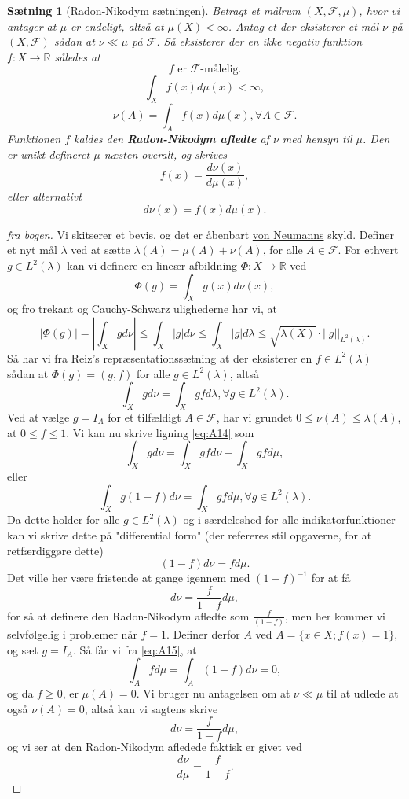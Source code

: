 \documentclass[12pt]{report}
\newtheorem{theorem}[lemma]{Sætning}
\theoremstyle{break}
\newtheorem*{proof}{Bevis}
\theoremstyle{break}
\newcommand{\RR}{\mathbb{R}}
\newcommand{\FI}{\mathcal{F}}
\newcommand{\1}{\mathds{1}}
\begin{document}
\begin{theorem}[Radon-Nikodym sætningen]
	 Betragt et målrum $(X,\FI,\mu)$, hvor vi antager at $\mu$ er endeligt, altså at  $\mu(X)<\infty$. Antag et der eksisterer et mål $\nu$ på $(X,\FI)$ sådan at $\nu \ll \mu$ på $\FI$. Så eksisterer der en ikke negativ funktion $f\colon X\to \RR$ således at
	 \[ f \text{ er }\FI\text{-målelig.} \]
	 \[ \int_X f(x)d\mu(x)<\infty, \]
	 \[ \nu(A)=\int_A f(x)d\mu(x), \forall A\in \FI .\]
	 Funktionen $f$ kaldes den {\bf Radon-Nikodym afledte} af $\nu$ med hensyn til $\mu$. Den er unikt defineret $\mu$ næsten overalt, og skrives
	 \[ f(x)=\frac{d\nu(x)}{d\mu(x)}, \]
	 eller alternativt
	 \[ d\nu(x)=f(x)d\mu(x). \]
\end{theorem}
\begin{proof}[fra bogen]
	Vi skitserer et bevis, og det er åbenbart \href{https://en.wikipedia.org/wiki/John_von_Neumann}{von Neumanns} skyld. Definer et nyt mål $\lambda$ ved at sætte $\lambda(A) = \mu(A)+\nu(A)$, for alle $A\in \FI$. For ethvert $g\in L^2(\lambda)$ kan vi definere en lineær afbildning $\Phi \colon X \to \RR$ ved
	\[ \Phi(g)=\int_Xg(x)d\nu(x), \]
	og fro trekant og Cauchy-Schwarz ulighederne har vi, at
	\[ |\Phi(g)|=\left\vert \int_X gd\nu\right\vert \leq \int_X |g|d\nu \leq \int_X |g|d\lambda \leq \sqrt{\lambda(X)}\cdot ||g||_{L^2(\lambda)}. \] 
	Så har vi fra Reiz's repræsentationssætning at der eksisterer en $f\in L^2(\lambda)$ sådan at $\Phi(g)=(g,f)$ for alle $g\in L^2(\lambda)$, altså
	\begin{equation}
		\int_X gd\nu=\int_X gfd\lambda, \forall g\in L^2(\lambda).\label{eq:A14}
	\end{equation}
	Ved at vælge $g=I_A$ for et tilfældigt $A\in \FI$, har vi grundet $0\leq \nu(A)\leq\lambda(A)$, at $0\leq f \leq 1$. Vi kan nu skrive ligning \ref{eq:A14} som
	\[ \int_Xgd\nu=\int_X gfd\nu+\int_X gfd\mu, \]
	eller
	\begin{equation}
		\int_X g(1-f)d\nu=\int_X gfd\mu, \forall g\in L^2(\lambda). \label{eq:A15}
	\end{equation}
	Da dette holder for alle $g\in L^2(\lambda)$ og i særdeleshed for alle indikatorfunktioner kan vi skrive dette på "differential form" (der refereres stil opgaverne, for at retfærdiggøre dette)
	\[ (1-f)d\nu=fd\mu. \]
	Det ville her være fristende at gange igennem med $(1-f)^{-1}$ for at få
	\[ d\nu=\frac{f}{1-f}d\mu, \]
	for så at definere den Radon-Nikodym afledte som $\frac{f}{(1-f)}$, men her kommer vi selvfølgelig i problemer når $f=1$. Definer derfor $A$ ved $A=\{ x\in X;f(x)=1 \}$, og sæt $g=I_A$. Så får vi fra \ref{eq:A15}, at
	\[ \int_A fd\mu=\int_A(1-f)d\nu=0, \]
	og da $f\geq 0$, er $\mu(A)=0$. Vi bruger nu antagelsen om at $\nu\ll\mu$ til at udlede at også $\nu(A)=0$, altså kan vi sagtens skrive
	\[ d\nu=\frac{f}{1-f}d\mu, \]
	og vi ser at den Radon-Nikodym afledede faktisk er givet ved
	\[ \frac{d\nu}{d\mu}=\frac{f}{1-f}.\]
\end{proof}
\end{document}
